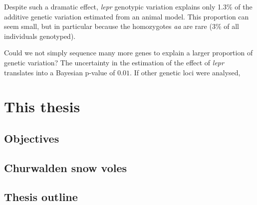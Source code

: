 Despite such a dramatic effect, \emph{lepr} genotypic variation explains only 1.3\% of the additive genetic variation estimated from an animal model. This proportion can seem small, but in particular because the homozygotes \emph{aa} are rare (3\% of all individuals genotyped).

Could we not simply sequence many more genes to explain a larger proportion of genetic variation?
The uncertainty in the estimation of the effect of \emph{lepr} translates into a Bayesian p-value of $0.01$. 
If other genetic loci were analysed, 


\section{This thesis}

\subsection{Objectives}

\subsection{Churwalden snow voles}

\subsection{Thesis outline}


